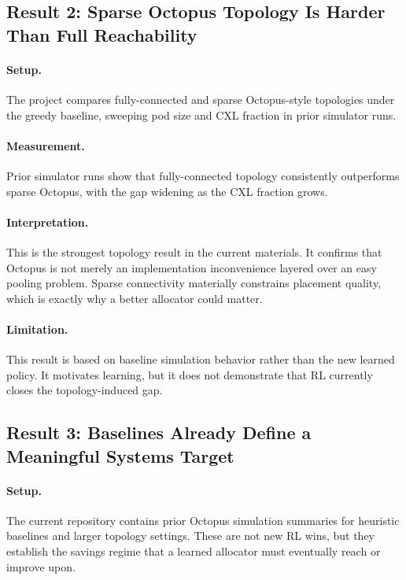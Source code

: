 \documentclass[11pt]{article}
\theoremstyle{definition}
\begin{document}
\subsection{Result 2: Sparse Octopus Topology Is Harder Than Full Reachability}

\paragraph{Setup.}
The project compares fully-connected and sparse Octopus-style topologies under
the greedy baseline, sweeping pod size and CXL fraction in prior simulator runs.

\paragraph{Measurement.}
Prior simulator runs show that fully-connected topology consistently outperforms
sparse Octopus, with the gap widening as the CXL fraction grows.

\paragraph{Interpretation.}
This is the strongest topology result in the current materials. It confirms that
Octopus is not merely an implementation inconvenience layered over an easy
pooling problem. Sparse connectivity materially constrains placement quality,
which is exactly why a better allocator could matter.

\paragraph{Limitation.}
This result is based on baseline simulation behavior rather than the new learned
policy. It motivates learning, but it does not demonstrate that RL currently
closes the topology-induced gap.

\subsection{Result 3: Baselines Already Define a Meaningful Systems Target}

\paragraph{Setup.}
The current repository contains prior Octopus simulation summaries for heuristic
baselines and larger topology settings. These are not new RL wins, but they
establish the savings regime that a learned allocator must eventually reach or
improve upon.
\end{document}
